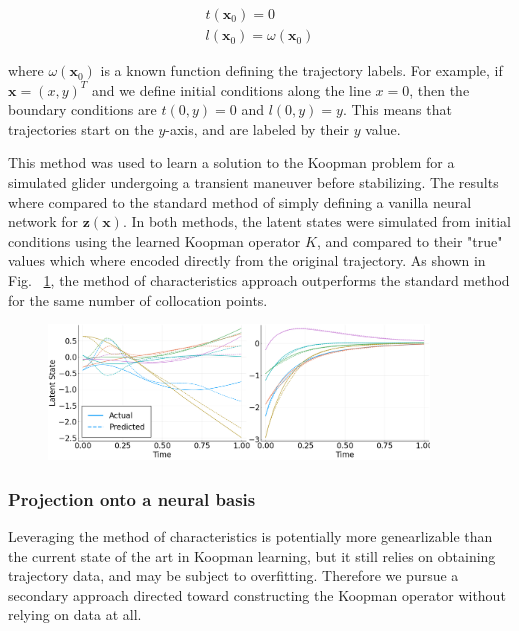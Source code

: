 \documentclass[12pt, letterpaper]{article}
\begin{document}
\begin{equation}
    \begin{matrix}
        t(\mathbf{x}_0) = 0 \\
        l(\mathbf{x}_0) = \omega(\mathbf{x}_0)
    \end{matrix}
\end{equation}

where $\omega(\mathbf{x}_0)$ is a known function defining the trajectory labels.  For example, if $\mathbf{x} = (x, y)^T$ and we define initial conditions along the line $x = 0$, then the boundary conditions are $t(0,y) = 0$ and $l(0,y) = y$.  This means that trajectories start on the $y$-axis, and are labeled by their $y$ value.

This method was used to learn a solution to the Koopman problem for a simulated glider undergoing a transient maneuver before stabilizing.  The results where compared to the standard method of simply defining a vanilla neural network for $\mathbf{z}(\mathbf{x})$.  In both methods, the latent states were simulated from initial conditions using the learned Koopman operator $K$, and compared to their "true" values which where encoded directly from the original trajectory.  As shown in Fig. ~\ref{fig:method_of_characteristics}, the method of characteristics approach outperforms the standard method for the same number of collocation points.  

\begin{figure}[hbt!]
\centering
\includegraphics[width=0.9\textwidth]{figures/method_of_characteristics.png}
\caption{}
\label{fig:method_of_characteristics}
\end{figure}

\subsubsection{Projection onto a neural basis}

Leveraging the method of characteristics is potentially more genearlizable than the current state of the art in Koopman learning, but it still relies on obtaining trajectory data, and may be subject to overfitting.  Therefore we pursue a secondary approach directed toward constructing the Koopman operator without relying on data at all.
\end{document}
